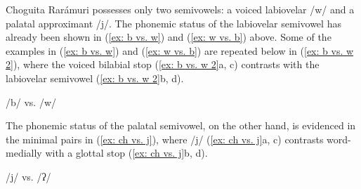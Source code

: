 Choguita Rarámuri possesses only two semivowels: a voiced labiovelar /w/ and a palatal approximant /j/. The phonemic status of the labiovelar semivowel has already been shown in (\ref{ex: b vs. w}) and (\ref{ex: w vs. b}) above. Some of the examples in (\ref{ex: b vs. w}) and (\ref{ex: w vs. b}) are repeated below in (\ref{ex: b vs. w 2}), where the voiced bilabial stop (\ref{ex: b vs. w 2}a, c) contrasts with the labiovelar semivowel (\ref{ex: b vs. w 2}b, d).

\ea\label{ex: b vs. w 2}
{/b/ vs. /w/}

    \z
\z

The phonemic status of the palatal semivowel, on the other hand, is evidenced in the minimal pairs in (\ref{ex: ch vs. j}), where /j/ (\ref{ex: ch vs. j}a, c) contrasts word-medially with a glottal stop (\ref{ex: ch vs. j}b, d).

\ea\label{ex: ch vs. j}
{/j/ vs. /ʔ/}

